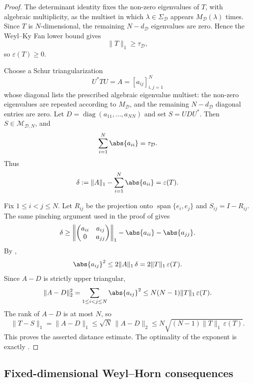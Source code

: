 \begin{proof}
  The determinant identity fixes the non-zero eigenvalues of \(T\), with
  algebraic multiplicity, as the multiset in which
  \(\lambda\in\Sigma_{\mathcal D}\) appears
  \(M_{\mathcal D}(\lambda)\) times. Since \(T\) is \(N\)-dimensional,
  the remaining \(N-d_{\mathcal D}\) eigenvalues are zero. Hence the
  Weyl--Ky Fan lower bound gives
  \[
    \|T\|_1\ge\tau_{\mathcal D},
  \]
  so \(\varepsilon(T)\ge0\).

  Choose a Schur triangularization
  \[
    U^*TU=A=[a_{ij}]_{i,j=1}^N
  \]
  whose diagonal lists the prescribed algebraic eigenvalue multiset:
  the non-zero eigenvalues are repeated according to
  \(M_{\mathcal D}\), and the remaining \(N-d_{\mathcal D}\) diagonal
  entries are zero. Let
  \(D=\operatorname{diag}(a_{11},\ldots,a_{NN})\) and set
  \(S=UDU^*\). Then \(S\in\mathcal M_{\mathcal D,N}\), and
  \[
    \sum_{i=1}^N\abs{a_{ii}}=\tau_{\mathcal D}.
  \]
  Thus
  \[
    \delta:=\|A\|_1-\sum_{i=1}^N\abs{a_{ii}}
    =\varepsilon(T).
  \]

  Fix \(1\le i<j\le N\). Let \(R_{ij}\) be the projection onto
  \(\operatorname{span}\{e_i,e_j\}\) and \(S_{ij}=I-R_{ij}\). The same
  pinching argument used in the proof of
   gives
  \[
    \delta
    \ge
    \left\|
      \begin{pmatrix}
        a_{ii} & a_{ij}\\
        0 & a_{jj}
      \end{pmatrix}
    \right\|_1-\abs{a_{ii}}-\abs{a_{jj}} .
  \]
  By ,
  \[
    \abs{a_{ij}}^2
    \le
    2\|A\|_1\,\delta
    =
    2\|T\|_1\,\varepsilon(T).
  \]
  Since \(A-D\) is strictly upper triangular,
  \[
    \|A-D\|_2^2
    =
    \sum_{1\le i<j\le N}\abs{a_{ij}}^2
    \le N(N-1)\|T\|_1\,\varepsilon(T).
  \]
  The rank of \(A-D\) is at most \(N\), so
  \[
    \|T-S\|_1
    =\|A-D\|_1
    \le \sqrt N\,\|A-D\|_2
    \le N\sqrt{(N-1)\|T\|_1\,\varepsilon(T)}.
  \]
  This proves the asserted distance estimate. The optimality of the
  exponent is exactly .
\end{proof}


\subsection{Fixed-dimensional Weyl--Horn consequences}\label{sec:fixed-dimensional-weyl-horn-consequences}


